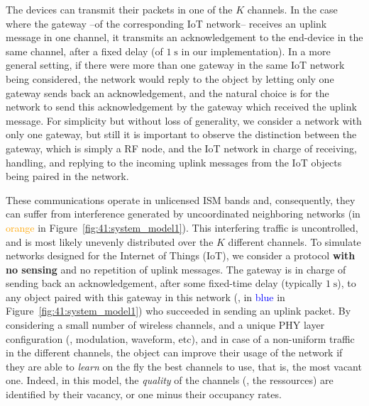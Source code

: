 The devices can transmit their packets in one of the $K$ channels. In the case where the gateway --of the corresponding IoT network-- receives an uplink message in one channel, it transmits an acknowledgement to the end-device in the same channel, after a fixed delay (of $1\;\mathrm{s}$ in our implementation).
In a more general setting, if there were more than one gateway in the same IoT network being considered, the network would reply to the object by letting only one gateway sends back an acknowledgement, and the natural choice is for the network to send this acknowledgement by the gateway which received the uplink message.
For simplicity but without loss of generality, we consider a network with only one gateway,
but still it is important to observe the distinction between the gateway, which is simply a RF node, and the IoT network in charge of receiving, handling, and replying to the incoming uplink messages from the IoT objects being paired in the network.
%

These communications operate in unlicensed ISM bands and, consequently, they can suffer from interference generated by uncoordinated neighboring networks (in \textcolor{orange}{orange} in Figure~\ref{fig:41:system_model1}).
This interfering traffic is uncontrolled, and is most likely unevenly distributed over the $K$ different channels.
%
To simulate networks designed for the Internet of Things (IoT), we consider a protocol \textbf{with no sensing} and no repetition of uplink messages. The gateway is in charge of sending back an acknowledgement, after some fixed-time delay (typically $1\;\mathrm{s}$), to any object paired with this gateway in this network (\ie, in \textcolor{blue}{blue} in Figure~\ref{fig:41:system_model1}) who succeeded in sending an uplink packet.
%
By considering a small number of wireless channels, and a unique PHY layer configuration (\ie, modulation, waveform, etc), and in case of a non-uniform traffic in the different channels,
the object can improve their usage of the network if they are able to \emph{learn} on the fly the best channels to use, that is, the most vacant one. Indeed, in this model, the \emph{quality} of the channels (\ie, the ressources) are identified by their vacancy, or one minus their occupancy rates.



